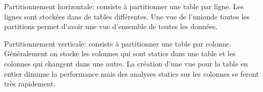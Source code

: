 Partitionnement horizontale: consiste à partitionner une table par ligne.
Les lignes sont stockées dans de tables différentes. Une vue de l'unionde toutes
les partitions permet d'avoir une vue d'ensemble de toutes les données. 

Partitionnement verticale: consiste à partitionner une table par colonne.
Généralement on stocke les colonnes qui sont statics dans une table et les
colonnes qui changent dans une autre. La création d'une vue pour la table en 
entier diminue la performance mais des analyses statics sur les colonnes
se feront très rapidement.
